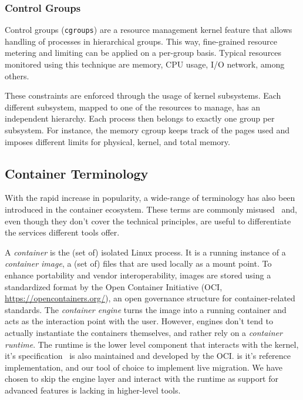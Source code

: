 \subsubsection*{Control Groups}

Control groups (\texttt{cgroups}) are a resource management kernel feature that allows handling of processes in hierarchical groups.
This way, fine-grained resource metering and limiting can be applied on a per-group basis.
Typical resources monitored using this technique are memory, CPU usage, I/O network, among others.

These constraints are enforced through the usage of kernel subsystems.
Each different subsystem, mapped to one of the resources to manage, has an independent hierarchy.
Each process then belongs to exactly one group per subsystem.
For instance, the memory cgroup keeps track of the pages used and imposes different limits for physical, kernel, and total memory.

\subsection*{Container Terminology}

With the rapid increase in popularity, a wide-range of terminology has also been introduced in the container ecosystem.
These terms are commonly misused~\cite{McCarty2018} and, even though they don't cover the technical principles, are useful to differentiate the services different tools offer.

A \emph{container} is the (set of) isolated Linux process.
It is a running instance of a \emph{container image}, a (set of) files that are used locally as a mount point.
To enhance portability and vendor interoperability, images are stored using a standardized format by the Open Container Initiative (OCI, \url{https://opencontainers.org/}), an open governance structure for container-related standards.
The \emph{container engine} turns the image into a running container and acts as the interaction point with the user.
However, engines don't tend to actually instantiate the containers themselves, and rather rely on a \textit{container runtime}.
The runtime is the lower level component that interacts with the kernel, it's specification~\cite{container-runtime-specification} is also maintained and developed by the OCI.
\runc is it's reference implementation, and our tool of choice to implement live migration.
We have chosen to skip the engine layer and interact with the runtime as support for advanced \criu features is lacking in higher-level tools.

